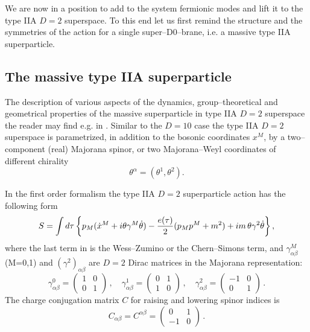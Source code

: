 \documentclass[a4paper,12pt]{article}
\begin{document}
We are now in a position to add to the system fermionic modes and
lift it to the type IIA $D=2$ superspace. To this end let us first
remind the structure and the symmetries of the action for a single
super--D0--brane, i.e. a massive type IIA  superparticle.

\subsection{The massive type IIA  superparticle}

The description of various aspects of the dynamics,
group--theoretical and geometrical properties of the massive
superparticle in type IIA $D=2$ superspace the reader may find e.g.
in \cite{achu,Pasti:2000zs}. Similar to the $D=10$ case the type
IIA $D=2$ superspace is parametrized, in addition to the bosonic
coordinates
$x^M$, by a two--component (real) Majorana spinor, or two Majorana--Weyl
coordinates of different chirality
\begin{equation}\label{19}
\theta^\alpha=(\theta^1,\theta^2).
\end{equation}

In the first order formalism the type IIA $D=2$ superparticle
action has the following form
\begin{equation}\label{20}
S=\int d\tau
\left\{p_M(\dot x^M+i\theta\gamma^M\dot\theta)-{{e(\tau)}\over
2}(p_Mp^M+m^2)+im\,\theta\gamma^2\dot\theta\right\},
\end{equation}
where the last term in  is the Wess--Zumino or the
Chern--Simons term, and $\gamma^M_{\alpha\beta}$ (M=0,1) and
$(\gamma^2)_{\alpha\beta}$ are $D=2$ Dirac
matrices in the Majorana representation:
\begin{equation}\label{gamma}
\gamma^{0}_{ \alpha \beta}= \left(
\begin{array}{cc}
1  &  0\\
0 &  1
\end{array}
\right)\,, \quad \gamma^{1}_{ \alpha \beta}=
\left(
\begin{array}{cc}
0  &  1\\
1 &  0
\end{array}
\right)\, , \quad \gamma^2_{ \alpha \beta}=\left(
\begin{array}{cc}
-1   &  0\\
0   &   1
\end{array}
\right) \,.
\end{equation}
The charge conjugation matrix $C$ for raising and lowering spinor
indices is
\begin{equation}\label{C}
 C_{ \alpha \beta}=C^{ \alpha \beta}=\left(
\begin{array}{cc}
0  &  1\\
-1 &  0
\end{array}
\right)\,.
\end{equation}
\end{document}
